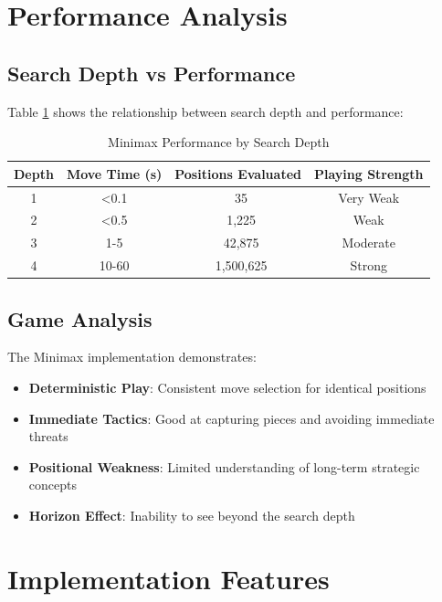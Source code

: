 \documentclass[11pt,a4paper]{report}
\begin{document}
\section{Performance Analysis}

\subsection{Search Depth vs Performance}
Table \ref{tab:minimax_performance} shows the relationship between search depth and performance:

\begin{table}[H]
\caption{Minimax Performance by Search Depth}
\label{tab:minimax_performance}
\begin{center}
\begin{tabular}{|c|c|c|c|}
\hline
\textbf{Depth} & \textbf{Move Time (s)} & \textbf{Positions Evaluated} & \textbf{Playing Strength} \\
\hline
1 & <0.1 & ~35 & Very Weak \\
2 & <0.5 & ~1,225 & Weak \\
3 & 1-5 & ~42,875 & Moderate \\
4 & 10-60 & ~1,500,625 & Strong \\
\hline
\end{tabular}
\end{center}
\end{table}

\subsection{Game Analysis}
The Minimax implementation demonstrates:

\begin{itemize}
    \item \textbf{Deterministic Play}: Consistent move selection for identical positions
    \item \textbf{Immediate Tactics}: Good at capturing pieces and avoiding immediate threats
    \item \textbf{Positional Weakness}: Limited understanding of long-term strategic concepts
    \item \textbf{Horizon Effect}: Inability to see beyond the search depth
\end{itemize}

\section{Implementation Features}
\end{document}
